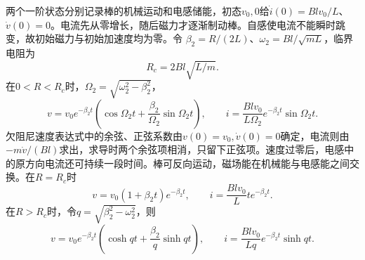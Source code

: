 \documentclass[UTF8,fontset=fandol,a4paper,11pt]{ctexart}
\begin{document}
两个一阶状态分别记录棒的机械运动和电感储能，初态$v_0,0$给$\dot i(0)=Blv_0/L$、$\dot v(0)=0$。电流先从零增长，随后磁力才逐渐制动棒。自感使电流不能瞬时跳变，故初始磁力与初始加速度均为零。令
$\beta_2=R/(2L)$、$\omega_2=Bl/\sqrt{mL}$，临界电阻为
\[
\boxed{R_c=2Bl\sqrt{L/m}}.
\]
在$0<R<R_c$时，$\Omega_2=\sqrt{\omega_2^2-\beta_2^2}$，
\[
\boxed{v=v_0e^{-\beta_2t}
\left(\cos\Omega_2t+\frac{\beta_2}{\Omega_2}\sin\Omega_2t\right)},\qquad
\boxed{i=\frac{Blv_0}{L\Omega_2}e^{-\beta_2t}\sin\Omega_2t}.
\]
欠阻尼速度表达式中的余弦、正弦系数由$v(0)=v_0,\dot v(0)=0$确定，电流则由$-m\dot v/(Bl)$求出，求导时两个余弦项相消，只留下正弦项。速度过零后，电感中的原方向电流还可持续一段时间。棒可反向运动，磁场能在机械能与电感能之间交换。在$R=R_c$时
\[
v=v_0(1+\beta_2t)e^{-\beta_2t},\qquad
i=\frac{Blv_0}{L}t e^{-\beta_2t}.
\]
在$R>R_c$时，令$q=\sqrt{\beta_2^2-\omega_2^2}$，则
\[
v=v_0e^{-\beta_2t}
\left(\cosh qt+\frac{\beta_2}{q}\sinh qt\right),\qquad
i=\frac{Blv_0}{Lq}e^{-\beta_2t}\sinh qt.
\]
\end{document}
